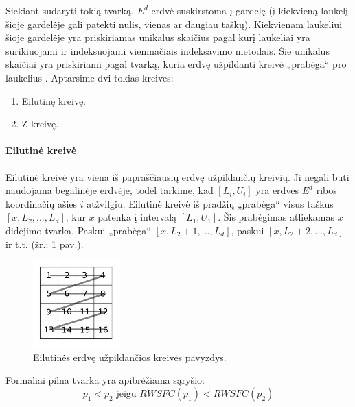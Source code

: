 Siekiant sudaryti tokią tvarką, $E^d$ erdvė suskirstoma į gardelę (į kiekvieną laukelį šioje gardelėje gali patekti nulis, vienas ar daugiau taškų).
Kiekvienam laukeliui šioje gardelėje yra priskiriamas unikalus skaičius pagal kurį laukeliai yra surikiuojami ir indeksuojami vienmačiais indeksavimo metodais.
Šie unikalūs skaičiai yra priskiriami pagal tvarką, kuria erdvę užpildanti kreivė „prabėga“ pro laukelius \cite{bader2012space}.
Aptarsime dvi tokias kreives:
\begin{enumerate}
	\item Eilutinę kreivę.
	\item Z-kreivę.
\end{enumerate}

\paragraph{Eilutinė kreivė}

Eilutinė kreivė yra viena iš papraščiausių erdvę užpildančių kreivių.
Ji negali būti naudojama begalinėje erdvėje, todėl tarkime, kad $[L_i, U_i]$ yra erdvės $E^d$ ribos koordinačių ašies $i$ atžvilgiu.
Eilutinė kreivė iš pradžių „prabėga“ visus taškus $[x, L_2, ..., L_d]$, kur $x$ patenka į intervalą $[L_1, U_1]$.
Šis prabėgimas atliekamas $x$ didėjimo tvarka.
Paskui „prabėga“ $[x, L_2 + 1, ..., L_d]$, paskui $[x, L_2 + 2, ..., L_d]$ ir t.t. (žr.: \ref{img:RowWiseSpaceFillingCurve} pav.).

\begin{figure}[H]
\begin{center}
\includegraphics[width=0.3\textwidth]{img/RowWiseSpaceFillingCurve.png}
\caption{Eilutinės erdvę užpildančios kreivės pavyzdys.}
\label{img:RowWiseSpaceFillingCurve}
\end{center}
\end{figure}


Formaliai pilna tvarka yra apibrėžiama sąryšio:
\begin{equation}
	p_1 < p_2 \text{ jeigu } RWSFC(p_1) < RWSFC(p_2)
\label{eq:RowWiseSFCComparison}
\end{equation}

